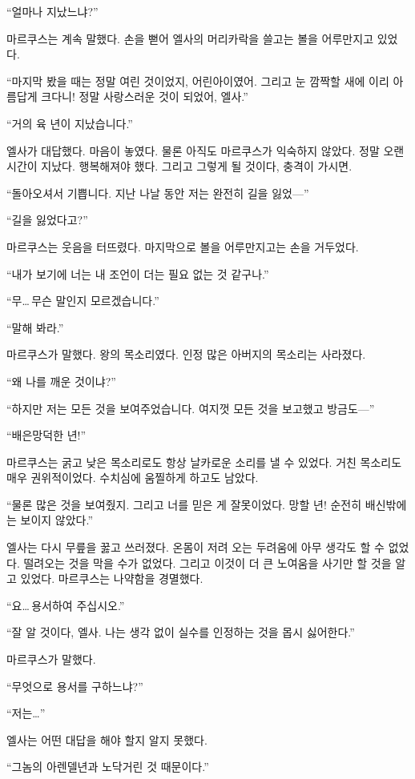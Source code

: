 ``얼마나 지났느냐?''

마르쿠스는 계속 말했다. 손을 뻗어 엘사의 머리카락을 쓸고는 볼을 어루만지고 있었다.

``마지막 봤을 때는 정말 여린 것이었지, 어린아이였어. 그리고 눈 깜짝할 새에 이리 아름답게 크다니! 정말 사랑스러운 것이 되었어, 엘사.''

``거의 육 년이 지났습니다.''

엘사가 대답했다. 마음이 놓였다. 물론 아직도 마르쿠스가 익숙하지 않았다. 정말 오랜 시간이 지났다. 행복해져야 했다. 그리고 그렇게 될 것이다, 충격이 가시면.

``돌아오셔서 기쁩니다. 지난 나날 동안 저는 완전히 길을 잃었—''

``길을 잃었다고?''

마르쿠스는 웃음을 터뜨렸다. 마지막으로 볼을 어루만지고는 손을 거두었다.

``내가 보기에 너는 내 조언이 더는 필요 없는 것 같구나.''

``무\ldots\,무슨 말인지 모르겠습니다.''

``말해 봐라.''

마르쿠스가 말했다. 왕의 목소리였다. 인정 많은 아버지의 목소리는 사라졌다.

``왜 나를 깨운 것이냐?''

``하지만 저는 모든 것을 보여주었습니다. 여지껏 모든 것을 보고했고 방금도—''

``배은망덕한 년!''

마르쿠스는 굵고 낮은 목소리로도 항상 날카로운 소리를 낼 수 있었다. 거친 목소리도 매우 권위적이었다. 수치심에 움찔하게 하고도 남았다.

``물론 많은 것을 보여줬지. 그리고 너를 믿은 게 잘못이었다. 망할 년! 순전히 배신밖에는 보이지 않았다.''

엘사는 다시 무릎을 꿇고 쓰러졌다. 온몸이 저려 오는 두려움에 아무 생각도 할 수 없었다. 떨려오는 것을 막을 수가 없었다. 그리고 이것이 더 큰 노여움을 사기만 할 것을 알고 있었다. 마르쿠스는 나약함을 경멸했다.

``요\ldots\,용서하여 주십시오.''

``잘 알 것이다, 엘사. 나는 생각 없이 실수를 인정하는 것을 몹시 싫어한다.''

마르쿠스가 말했다.

``무엇으로 용서를 구하느냐?''

``저는\ldots''

엘사는 어떤 대답을 해야 할지 알지 못했다.

``그놈의 아렌델년과 노닥거린 것 때문이다.''


